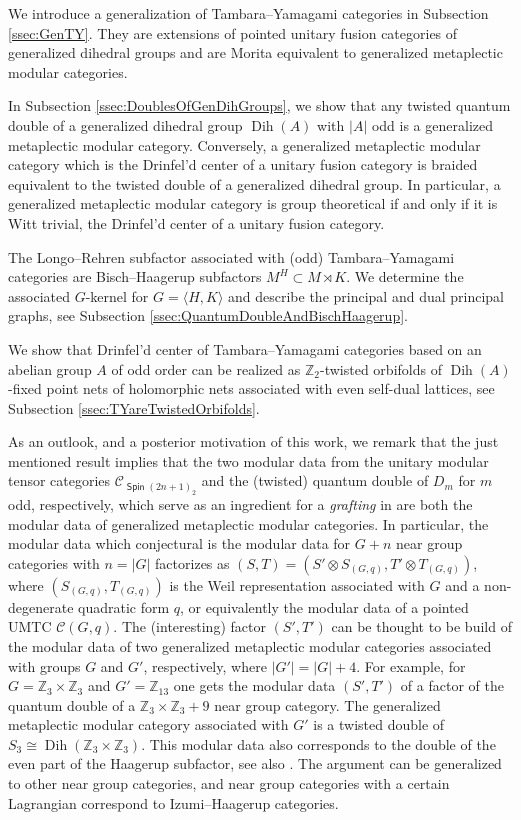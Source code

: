 \documentclass[twoside,11pt,reqno]{amsart}
\theoremstyle{definition}
\theoremstyle{remark}
\newcommand{\Spin}{\mathop{\mathsf{Spin}}}
\newcommand{\cC}{\mathcal{C}}
\newcommand{\ZZ}{\mathbb{Z}}
\DeclareMathOperator{\Dih}{Dih}
\newcommand{\umtc}[1]{\cC_{#1}}
\begin{document}
We introduce a generalization of Tambara--Yamagami categories in 
Subsection \ref{ssec:GenTY}. 
They are extensions of pointed unitary fusion categories of 
    generalized dihedral groups and are Morita equivalent to 
    generalized metaplectic modular categories.

In Subsection \ref{ssec:DoublesOfGenDihGroups}, we show that any 
twisted quantum double of a generalized dihedral group $\Dih(A)$ with $|A|$ odd
is a generalized metaplectic modular category.
Conversely, a generalized metaplectic modular category
which is the Drinfel'd center of a unitary fusion category
is braided equivalent to the twisted double
of a generalized dihedral group.
In particular, a generalized metaplectic modular category
is group theoretical if and only if it is Witt trivial, 
the Drinfel'd center of a unitary fusion category.

  
The Longo--Rehren subfactor associated with (odd) Tambara--Yamagami categories
are Bisch--Haagerup subfactors $M^H\subset M\rtimes K$. 
We determine the associated $G$-kernel for 
  $G=\langle H,K\rangle$ and describe the principal and dual principal graphs,
see Subsection \ref{ssec:QuantumDoubleAndBischHaagerup}.

We show that Drinfel'd center of Tambara--Yamagami categories based on an 
abelian group $A$ of odd order can be realized as $\ZZ_2$-twisted orbifolds of  
$\Dih(A)$-fixed point nets of holomorphic nets associated with 
even self-dual lattices, see Subsection \ref{ssec:TYareTwistedOrbifolds}.
%


As an outlook, and a posterior motivation of this work, 
we remark that the just mentioned result implies that
the two modular data from the unitary modular tensor categories
$\umtc{\Spin(2n+1)_2}$ and the (twisted) quantum double of $D_m$ for $m$ odd, 
respectively, which serve as an ingredient for a \emph{grafting} in 
\cite{EvGa2011} are both the modular data of 
generalized metaplectic modular categories. 
In particular, the modular data \cite[Proposition 7b]{EvGa2014} 
which conjectural is the modular data for $G+n$ near group categories 
\cite{EvGa2014} with 
$n=|G|$ factorizes as $(S,T)=(S'\otimes S_{(G,q)}, T'\otimes T_{(G,q)})$,
where  $(S_{(G,q)}, T_{(G,q)})$ is the Weil representation associated with
$G$ and a non-degenerate quadratic form $q$, or equivalently the 
modular data of a pointed UMTC $\cC(G,q)$. 
The (interesting) factor $(S',T')$ can be thought to be build of the 
modular data of two generalized metaplectic modular categories 
associated with groups $G$ and $G'$, respectively, where $|G'|=|G|+4$. 
For example, for $G=\ZZ_3\times\ZZ_3$ and $G'=\ZZ_{13}$ one gets 
the modular data $(S',T')$ of a factor of the quantum double of a 
$\ZZ_3\times\ZZ_3+9$ near group category.
The generalized metaplectic modular category associated with $G'$ is a 
twisted double of $S_3\cong \Dih(\ZZ_3\times \ZZ_3)$. 
This modular data also corresponds to the double of the even part of the 
Haagerup subfactor, see also \cite[Remark 5.14]{Bi2016}.
The argument can be generalized to other near group categories, and 
near group categories with a certain Lagrangian correspond to
Izumi--Haagerup categories.
\end{document}
